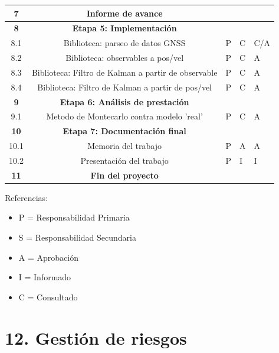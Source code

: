 \documentclass[11pt]{charter}
\begin{document}
\begin{table}[htpb]
{\begin{tabular}{|c|c|m{3cm}|m{3cm}|m{3cm}|}
\rowcolor{lightgray!50}
\textbf{7} 	& \textbf{Informe de avance} 							& 			 	& 				&  \\ \hline
\rowcolor{lightgray!50}
\textbf{8}	& \textbf{Etapa 5: Implementación}						& 			 	& 			 	& \\ \hline
8.1			& Biblioteca: parseo de datos GNSS						& P	 			& C	 			& C/A \\ \hline
8.2			& Biblioteca: observables a pos/vel					& P	 			& C	 			& A	\\ \hline
8.3			& Biblioteca: Filtro de Kalman a partir de observable & P	 			& C	 			& A	\\ \hline
8.4			& Biblioteca: Filtro de Kalman a partir de pos/vel 	& P	 			& C	 			& A	\\ \hline
\rowcolor{lightgray!50}
\textbf{9} 	& \textbf{Etapa 6: Análisis de prestación}				& 				& 			 	&  \\ \hline
9.1			& Metodo de Montecarlo contra modelo 'real' 			& P	 			& C  			& A \\ \hline
\rowcolor{lightgray!50}
\textbf{10}	& \textbf{Etapa 7: Documentación final}				& 			 	& 			 	&  \\ \hline
10.1 		& Memoria del trabajo		 							& P 			& A	 			& A	\\ \hline
10.2 		& Presentación del trabajo		 						& P 			& I	 			& I	\\ \hline
\rowcolor{lightgray!50}
\textbf{11}	& \textbf{Fin del proyecto} 							& 			 	& 				& \\ \hline
\end{tabular}%
}
\end{table}

{\footnotesize
Referencias:
\begin{itemize}
	\item P = Responsabilidad Primaria
	\item S = Responsabilidad Secundaria
	\item A = Aprobación
	\item I = Informado
	\item C = Consultado
\end{itemize}
} %

\section{12. Gestión de riesgos}
\label{sec:riesgos}
\end{document}
